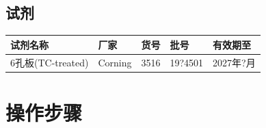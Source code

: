 \documentclass[UTF8,10pt,a4paper,fontset=fandol]{ctexart}
\newcommand{\fieldvalue}[1]{#1}
\newcommand{\handwritten}[1]{#1}
\begin{document}
\subsection{试剂}

\begin{tabular}{|p{3.8cm}|p{2.5cm}|p{1.5cm}|p{2.4cm}|p{2.4cm}|}
\hline
试剂名称 & 厂家 & 货号 & 批号 & 有效期至\\
\hline
\fieldvalue{6孔板(TC-treated)} &
\fieldvalue{Corning} &
\fieldvalue{3516} &
\fieldvalue{\handwritten{19?4501}} &
\fieldvalue{\handwritten{2027年?月}}\\
\hline
\end{tabular}

\section{操作步骤}
\end{document}
